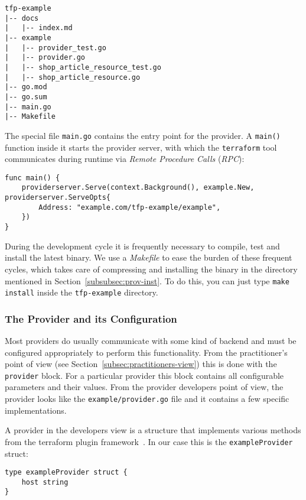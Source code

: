 \documentclass[paper=a4,11pt,numbers=noenddot]{article}
\begin{document}
\begin{lstlisting}[label=lst:directory-structure]
tfp-example
|-- docs
|   |-- index.md
|-- example
|   |-- provider_test.go
|   |-- provider.go
|   |-- shop_article_resource_test.go
|   |-- shop_article_resource.go
|-- go.mod
|-- go.sum
|-- main.go
|-- Makefile
\end{lstlisting}

The special file \verb'main.go' contains the entry point for the provider. A \verb'main()' function inside it starts the provider server, with which the \verb'terraform' tool communicates during runtime via \emph{Remote Procedure Calls} (\emph{RPC}):

\begin{lstlisting}[label=lst:main]
func main() {
    providerserver.Serve(context.Background(), example.New, providerserver.ServeOpts{
        Address: "example.com/tfp-example/example",
    })
}
\end{lstlisting}

During the development cycle it is frequently necessary to compile, test and install the latest binary. We use a \emph{Makefile} to ease the burden of these frequent cycles, which takes care of compressing and installing the binary in the directory mentioned in Section~\ref{subsubsec:prov-inst}. To do this, you can just type \verb'make install' inside the \verb'tfp-example' directory.

\subsubsection{The Provider and its Configuration}
\label{subsubsec:base-prov-conf}

Most providers do usually communicate with some kind of backend and must be configured appropriately to perform this functionality. From the practitioner's point of view (see Section~\ref{subsec:practitioners-view}) this is done with the \verb'provider' block. For a particular provider this block contains all configurable parameters and their values. From the provider developers point of view, the provider looks like the \verb'example/provider.go' file and it contains a few specific implementations.

A provider in the developers view is a structure that implements various methods from the terraform plugin framework~\cite{noauthor_terraform_framework_nodate}. In our case this is the \verb'exampleProvider' struct:

\begin{lstlisting}
type exampleProvider struct {
	host string
}
\end{lstlisting}
\end{document}
